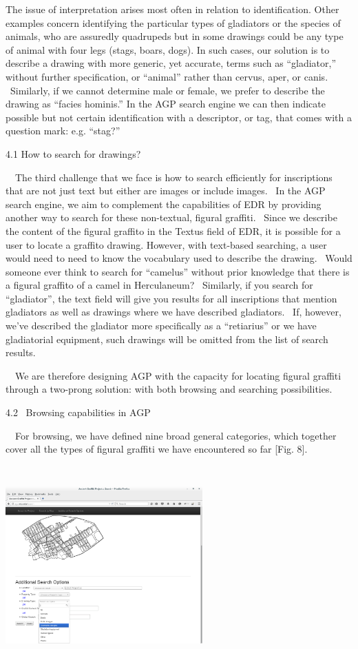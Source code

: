 \documentclass[amsthm,ebook]{saparticle}
\begin{document}
The issue of interpretation arises most often in relation to identification. Other examples concern identifying the
particular types of gladiators or the species of animals, who are assuredly quadrupeds but in some drawings could be
any type of animal with four legs (stags, boars, dogs). In such cases, our solution is to describe a drawing with more
generic, yet accurate, terms such as “gladiator,” without further specification, or “animal” rather than cervus, aper,
or canis. \ Similarly, if we cannot determine male or female, we prefer to describe the drawing as “facies hominis.” In
the AGP search engine we can then indicate possible but not certain identification with a descriptor, or tag, that
comes with a question mark: e.g. “stag?” 


\bigskip

4.1 How to search for drawings? 

\ \ The third challenge that we face is how to search efficiently for inscriptions that are not just text but either are
images or include images. \ In the AGP search engine, we aim to complement the capabilities of EDR by providing another
way to search for these non-textual, figural graffiti. \ Since we describe the content of the figural graffito in the
Textus field of EDR, it is possible for a user to locate a graffito drawing. However, with text-based searching, a user
would need to need to know the vocabulary used to describe the drawing. \ Would someone ever think to search for
“camelus” without prior knowledge that there is a figural graffito of a camel in Herculaneum? \ Similarly, if you
search for “gladiator”, the text field will give you results for all inscriptions that mention gladiators as well as
drawings where we have described gladiators. \ If, however, we’ve described the gladiator more specifically as a
“retiarius” or we have gladiatorial equipment, such drawings will be omitted from the list of search results.

\ \ We are therefore designing AGP with the capacity for locating figural graffiti through a two-prong solution: with
both browsing and searching possibilities. 


\bigskip

4.2 \ Browsing capabilities in AGP

\ \ For browsing, we have defined nine broad general categories, which together cover all the types of figural graffiti
we have encountered so far [Fig. 8]. 

 \includegraphics[width=7.567cm,height=7.586cm]{EAGLE2016BenefielSypniewski-img008.png} 
\end{document}
